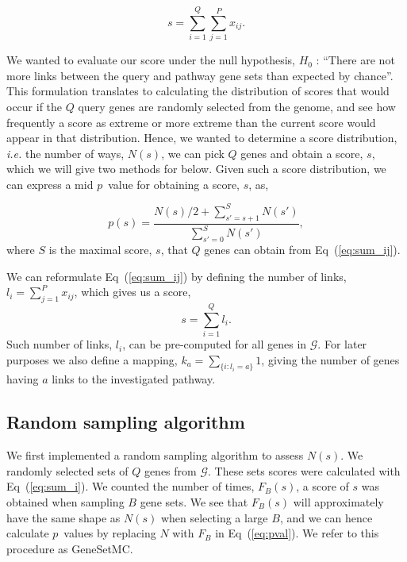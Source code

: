 \documentclass[10pt,letterpaper]{article}
\begin{document}
\begin{equation}
s=\sum_{i=1}^Q\sum_{j=1}^P x_{ij}.
\label{eq:sum_ij}
\end{equation}

We wanted to evaluate our score under the null hypothesis, $H_0$ : ``There are not more links between the query and pathway gene sets than expected by chance''. This formulation translates to calculating the distribution of scores that would occur if the $Q$ query genes are randomly selected from the genome, and see how frequently a score as extreme or more extreme than the current score would appear in that distribution. Hence, we wanted to determine a score distribution, {\em i.e.} the number of ways, $N(s)$, we can pick $Q$ genes and obtain a score, $s$, which we will give two methods for below. Given such a score distribution, we can express a mid $p$~value\cite{lancaster1961significance,hwang2001optimality} for obtaining a score, $s$, as,

\begin{equation}
p(s)=\frac{N(s)/2 +\sum_{s'=s+1}^{S} N(s')}{\sum_{s'=0}^{S} N(s')},
\label{eq:pval}
\end{equation}
where $S$ is the maximal score, $s$, that $Q$ genes can obtain from Eq~(\ref{eq:sum_ij}).

We can reformulate Eq~(\ref{eq:sum_ij}) by defining the number of links, $l_i=\sum_{j=1}^P x_{ij}$, which gives us a score,
\begin{equation}
s=\sum_{i=1}^Q l_i.
\label{eq:sum_i}
\end{equation}
Such number of links, $l_i$, can be pre-computed for all genes in $\mathcal{G}$. For later purposes we also define a mapping, $k_a=\sum_{\{i:l_i=a\}}1$, giving the number of genes having $a$ links to the investigated pathway.



\subsection*{Random sampling algorithm}

We first implemented a random sampling algorithm to assess $N(s)$. We randomly selected sets of $Q$ genes from $\mathcal{G}$. These sets scores were calculated with Eq~(\ref{eq:sum_i}). We counted the number of times, $F_B(s)$, a score of $s$ was obtained when sampling $B$ gene sets. We see that $F_B(s)$ will approximately have the same shape as $N(s)$ when selecting a large $B$, and we can hence calculate $p$~values by replacing $N$ with $F_B$ in Eq~(\ref{eq:pval}). We refer to this procedure as GeneSetMC.
\end{document}
